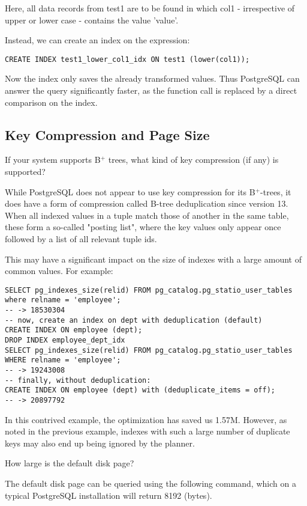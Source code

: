 \documentclass[11pt]{scrartcl}
\begin{document}
Here, all data records from test1 are to be found in which col1 - irrespective of upper or lower case - contains the value 'value'.

Instead, we can create an index on the expression:

\begin{lstlisting}[style=dbtsql]
CREATE INDEX test1_lower_col1_idx ON test1 (lower(col1));
\end{lstlisting}

Now the index only saves the already transformed values. Thus PostgreSQL can answer the query significantly faster, as the function call is replaced by a direct comparison on the index.

\subsection{Key Compression and Page Size}

If your system supports B$^+$ trees, what kind of key compression (if any) is supported?

While PostgreSQL does not appear to use key compression for its B$^+$-trees, it does have a form of compression called B-tree deduplication since version 13.  When all indexed values in a tuple match those of another in the same table, these form a so-called "posting list", where the key values only appear once followed by a list of all relevant tuple ids.

This may have a significant impact on the size of indexes with a large amount of common values.  For example:

\begin{lstlisting}[style=dbtsql]
SELECT pg_indexes_size(relid) FROM pg_catalog.pg_statio_user_tables where relname = 'employee';
-- -> 18530304
-- now, create an index on dept with deduplication (default)
CREATE INDEX ON employee (dept);
DROP INDEX employee_dept_idx
SELECT pg_indexes_size(relid) FROM pg_catalog.pg_statio_user_tables WHERE relname = 'employee';
-- -> 19243008
-- finally, without deduplication:
CREATE INDEX ON employee (dept) with (deduplicate_items = off);
-- -> 20897792
\end{lstlisting}

In this contrived example, the optimization has saved us 1.57M.  However, as noted in the previous example, indexes with such a large number of duplicate keys may also end up being ignored by the planner.

How large is the default disk page?

The default disk page can be queried using the following command, which on a typical PostgreSQL installation will return 8192 (bytes).
\end{document}
